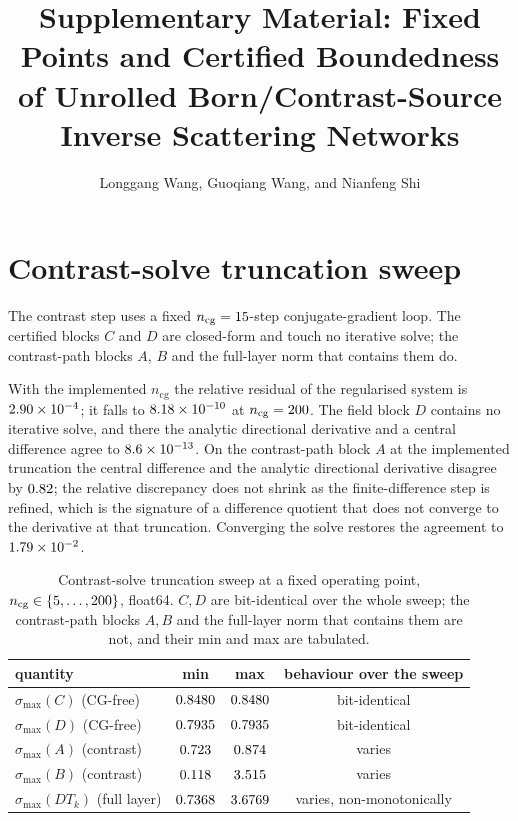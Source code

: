 \documentclass[12pt]{article}
\title{Supplementary Material: Fixed Points and Certified Boundedness of Unrolled Born/Contrast-Source Inverse Scattering Networks}
\author{Longgang Wang, Guoqiang Wang, and Nianfeng Shi}
\date{}
\newcommand{\numv}[1]{#1}
\begin{document}
\maketitle

\section{Contrast-solve truncation sweep}

The contrast step uses a fixed $n_{\mathrm{cg}}=\numv{\NumNCg}$-step conjugate-gradient loop.
The certified blocks $C$ and $D$ are closed-form and touch no iterative solve; the contrast-path
blocks $A$, $B$ and the full-layer norm that contains them do.

With the implemented $n_{\mathrm{cg}}$ the relative residual of the regularised system is
$\numv{\NumCgResidImpl}$; it falls to $\numv{\NumCgResidConv}$ at
$n_{\mathrm{cg}}=\numv{\NumNCgConv}$. The field block $D$ contains no iterative solve, and there
the analytic directional derivative and a central difference agree to
$\numv{\NumFdBlockD}$. On the contrast-path block $A$ at the implemented truncation the central
difference and the analytic directional derivative disagree by $\numv{\NumFdBlockAImpl}$; the
relative discrepancy does not shrink as the finite-difference step is refined, which is the
signature of a difference quotient that does not converge to the derivative at that truncation.
Converging the solve restores the agreement to $\numv{\NumFdBlockAConv}$.

\begin{table}[htbp]
\centering
\caption{Contrast-solve truncation sweep at a fixed operating point,
$n_{\mathrm{cg}}\in\{\numv{\NumCgNMin},\dots,\numv{\NumCgNMax}\}$, float64. $C,D$ are
bit-identical over the whole sweep; the contrast-path blocks $A,B$ and the full-layer norm
that contains them are not, and their min and max are tabulated.}
\begin{tabular}{lccc}
\toprule
quantity & min & max & behaviour over the sweep \\
\midrule
$\sigma_{\max}(C)$ (CG-free) & $\numv{\NumCgCMin}$ & $\numv{\NumCgCMax}$ & bit-identical \\
$\sigma_{\max}(D)$ (CG-free) & $\numv{\NumCgDMin}$ & $\numv{\NumCgDMax}$ & bit-identical \\
$\sigma_{\max}(A)$ (contrast) & $\numv{\NumCgAMin}$ & $\numv{\NumCgAMax}$ & varies \\
$\sigma_{\max}(B)$ (contrast) & $\numv{\NumCgBMin}$ & $\numv{\NumCgBMax}$ & varies \\
$\sigma_{\max}(DT_k)$ (full layer) & $\numv{\NumCgFullMin}$ & $\numv{\NumCgFullMax}$ & varies, non-monotonically \\
\bottomrule
\end{tabular}
\end{table}
\end{document}

